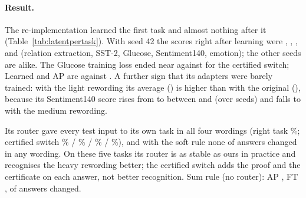\begin{table}[h]
  \caption{Original instructions, mean over \LatentSeeds{} seeds. Answers changed: answers to old inputs that differ from those given right after learning. Sum rule and all-on use no router. Rows 3 and 4 are our re-implementation.}
  \label{tab:latentmain}
  \centering
  \small
  
\end{table}

\begin{table}[h]
  \caption{The four wordings (Appendix~\ref{app:rewordings}), mean over \LatentSeeds{} seeds. Answers changed: of \LatentCompared{} answers. Right: share of test inputs given to their own task (soft rule: the adapter with the largest router weight).}
  \label{tab:latentwordings}
  \centering
  \small
  
\end{table}

\begin{table}[h]
  \caption{Original instructions, mean over \LatentSeeds{} seeds: score of each task right after it was learned, and the training loss of its last epoch.}
  \label{tab:latentpertask}
  \centering
  \small
  
\end{table}

\paragraph{Result.} The re-implementation learned the first task and almost nothing after it (Table~\ref{tab:latentpertask}). With seed 42 the scores right after learning were \LatentSeedSoftRelation{}, \LatentSeedSoftSst{}, \LatentSeedSoftGlucose{}, \LatentSeedSoftSenti{} and \LatentSeedSoftEmotion{} (relation extraction, SST-2, Glucose, Sentiment140, emotion); the other seeds are alike. The Glucose training loss ended near \LatentLossSoftGlucose{} against \LatentLossCertGlucose{} for the certified switch; Learned and AP are \LatentSoftAP{} against \LatentCertAP{}. A further sign that its adapters were barely trained: with the light rewording its average (\LatentSoftAPLight{}) is higher than with the original (\LatentSoftAP{}), because its Sentiment140 score rises from \LatentSoftSentOriginal{} to between \LatentSoftSentLightLow{} and \LatentSoftSentLightHigh{} (over seeds) and falls to \LatentSoftSentMediumMean{} with the medium rewording.

Its router gave every test input to its own task in all four wordings (right task \LatentSoftRight{}\%; certified switch \LatentCertRightOriginal{}\% / \LatentCertRightLight{}\% / \LatentCertRightMedium{}\% / \LatentCertRightHeavy{}\%), and with the soft rule none of \LatentCompared{} answers changed in any wording. On these five tasks its router is as stable as ours in practice and recognises the heavy rewording better; the certified switch adds the proof and the certificate on each answer, not better recognition. Sum rule (no router): AP \LatentSumAP{}, FT \LatentSumFT{}, \LatentSumChanged{} of \LatentCompared{} answers changed.

